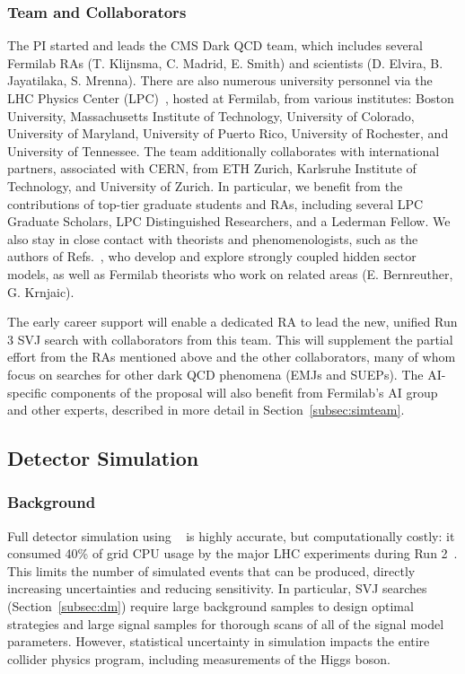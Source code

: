 \subsubsection{Team and Collaborators}\label{subsec:dmteam}

The PI started and leads the CMS Dark QCD team, which includes several Fermilab RAs (T. Klijnsma, C. Madrid, E. Smith) and scientists (D. Elvira, B. Jayatilaka, S. Mrenna).
There are also numerous university personnel via the LHC Physics Center (LPC)~\cite{LPC}, hosted at Fermilab, from various institutes:
Boston University, Massachusetts Institute of Technology, University of Colorado, University of Maryland, University of Puerto Rico, University of Rochester, and University of Tennessee.
The team additionally collaborates with international partners, associated with CERN, from ETH Zurich, Karlsruhe Institute of Technology, and University of Zurich.
In particular, we benefit from the contributions of top-tier graduate students and RAs, including several LPC Graduate Scholars, LPC Distinguished Researchers, and a Lederman Fellow.
We also stay in close contact with theorists and phenomenologists,
such as the authors of Refs.~\cite{Strassler:2006im,Cohen:2015toa,Schwaller:2015gea,Knapen:2016hky,Albouy:2022cin}, who develop and explore strongly coupled hidden sector models,
as well as Fermilab theorists who work on related areas (E. Bernreuther, G. Krnjaic).

The early career support will enable a dedicated RA to lead the new, unified Run 3 SVJ search with collaborators from this team.
This will supplement the partial effort from the RAs mentioned above and the other collaborators, many of whom focus on searches for other dark QCD phenomena (EMJs and SUEPs).
The AI-specific components of the proposal will also benefit from Fermilab's AI group and other experts, described in more detail in Section~\ref{subsec:simteam}.

\subsection{Detector Simulation}\label{subsec:sim}

\subsubsection{Background}\label{subsec:simbkg}

Full detector simulation using \GEANTfour~\cite{Agostinelli:2002hh} is highly accurate, but computationally costly:
it consumed 40\% of grid CPU usage by the major LHC experiments during Run 2~\cite{Apostolakis:2018ieg}.
This limits the number of simulated events that can be produced, directly increasing uncertainties and reducing sensitivity.
In particular, SVJ searches (Section~\ref{subsec:dm}) require large background samples to design optimal strategies
and large signal samples for thorough scans of all of the signal model parameters.
However, statistical uncertainty in simulation impacts the entire collider physics program, including measurements of the Higgs boson.

